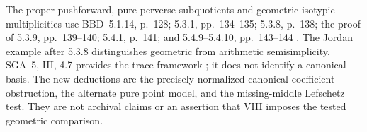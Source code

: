 The proper pushforward, pure perverse subquotients and
geometric isotypic multiplicities use BBD~5.1.14,
p.~128; 5.3.1, pp.~134--135; 5.3.8, p.~138;
the proof of 5.3.9, pp.~139--140; 5.4.1, p.~141;
and 5.4.9--5.4.10, pp.~143--144 \cite{BBD}.
The Jordan example after 5.3.8 distinguishes geometric
from arithmetic semisimplicity. SGA~5, III, 4.7
provides the trace framework \cite{SGA5}; it does
not identify a canonical basis. The new deductions
are the precisely normalized canonical-coefficient
obstruction, the alternate pure point model, and the
missing-middle Lefschetz test. They are not archival
claims or an assertion that VIII imposes the tested
geometric comparison.
